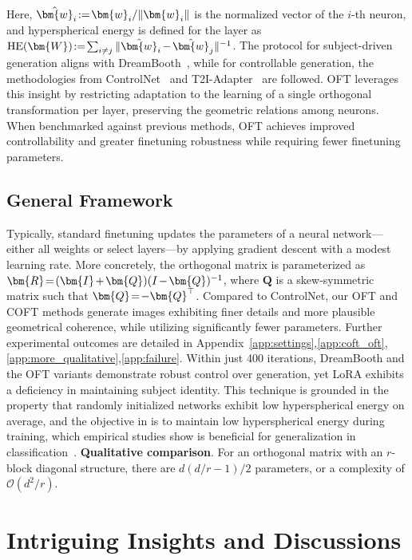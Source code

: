 Here, $\thickmuskip=2mu \medmuskip=2mu \hat{\bm{w}}_i:=\bm{w}_i/\|\bm{w}_i\|$ is the normalized vector of the $i$-th neuron, and hyperspherical energy is defined for the layer as $\thickmuskip=2mu \medmuskip=2mu \text{HE}(\bm{W}):= \sum_{i\neq j} \|\hat{\bm{w}}_i-\hat{\bm{w}}_j\|^{-1}$. The protocol for subject-driven generation aligns with DreamBooth~\cite{ruiz2023dreambooth}, while for controllable generation, the methodologies from ControlNet~\cite{zhang2023adding} and T2I-Adapter~\cite{mou2023t2i} are followed. OFT leverages this insight by restricting adaptation to the learning of a single orthogonal transformation per layer, preserving the geometric relations among neurons. When benchmarked against previous methods, OFT achieves improved controllability and greater finetuning robustness while requiring fewer finetuning parameters. \subsection{General Framework}

Typically, standard finetuning updates the parameters of a neural network—either all weights or select layers—by applying gradient descent with a modest learning rate. More concretely, the orthogonal matrix is parameterized as $\thickmuskip=2mu \medmuskip=2mu \bm{R}=(\bm{I}+\bm{Q})(I-\bm{Q})^{-1}$, where $\bm{Q}$ is a skew-symmetric matrix such that $\thickmuskip=2mu \medmuskip=2mu \bm{Q}=-\bm{Q}^\top$. Compared to ControlNet, our OFT and COFT methods generate images exhibiting finer details and more plausible geometrical coherence, while utilizing significantly fewer parameters. Further experimental outcomes are detailed in Appendix~\ref{app:settings},\ref{app:coft_oft},\ref{app:more_qualitative},\ref{app:failure}. Within just 400 iterations, DreamBooth and the OFT variants demonstrate robust control over generation, yet LoRA exhibits a deficiency in maintaining subject identity. This technique is grounded in the property that randomly initialized networks exhibit low hyperspherical energy on average, and the objective in \cite{liu2021orthogonal} is to maintain low hyperspherical energy during training, which empirical studies show is beneficial for generalization in classification~\cite{liu2018learning,lin2020regularizing}. \textbf{Qualitative comparison}. For an orthogonal matrix with an $r$-block diagonal structure, there are $d(d/r-1)/2$ parameters, or a complexity of $\mathcal{O}(d^2/r)$. \section{Intriguing Insights and Discussions}

